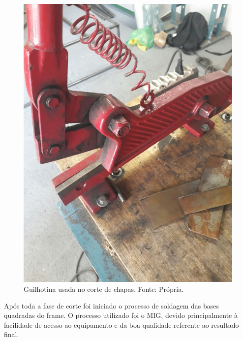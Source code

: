   \begin{figure}[H]
    \centering
    \includegraphics[scale= 0.3]{figuras/estrutura/guilhotina.jpg}
    \caption{Guilhotina usada no corte de chapas. Fonte: Própria.}
    \label{modelagem}
  \end{figure}

  Após toda a fase de corte foi iniciado o processo de soldagem das bases quadradas do frame. 
  O processo utilizado foi o MIG, devido principalmente à facilidade de acesso ao equipamento 
  e da boa qualidade referente ao resultado final. 

